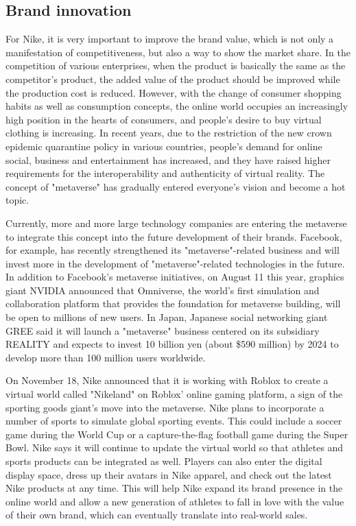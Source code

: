 \documentclass[a4paper, 12pt]{report}
\begin{document}
\subsection{Brand innovation}
For Nike, it is very important to improve the brand value, which is not only a manifestation of competitiveness, but also a way to show the market share. In the competition of various enterprises, when the product is basically the same as the competitor's product, the added value of the product should be improved while the production cost is reduced. However, with the change of consumer shopping habits as well as consumption concepts, the online world occupies an increasingly high position in the hearts of consumers, and people's desire to buy virtual clothing is increasing. In recent years, due to the restriction of the new crown epidemic quarantine policy in various countries, people's demand for online social, business and entertainment has increased, and they have raised higher requirements for the interoperability and authenticity of virtual reality. The concept of "metaverse" has gradually entered everyone's vision and become a hot topic.\par
Currently, more and more large technology companies are entering the metaverse to integrate this concept into the future development of their brands. Facebook, for example, has recently strengthened its "metaverse"-related business and will invest more in the development of "metaverse"-related technologies in the future. In addition to Facebook's metaverse initiatives, on August 11 this year, graphics giant NVIDIA announced that Omniverse, the world's first simulation and collaboration platform that provides the foundation for metaverse building, will be open to millions of new users. In Japan, Japanese social networking giant GREE said it will launch a "metaverse" business centered on its subsidiary REALITY and expects to invest 10 billion yen (about \$590 million) by 2024 to develop more than 100 million users worldwide.\par
On November 18, Nike announced that it is working with Roblox to create a virtual world called "Nikeland" on Roblox' online gaming platform, a sign of the sporting goods giant's move into the metaverse. Nike plans to incorporate a number of sports to simulate global sporting events. This could include a soccer game during the World Cup or a capture-the-flag football game during the Super Bowl. Nike says it will continue to update the virtual world so that athletes and sports products can be integrated as well. Players can also enter the digital display space, dress up their avatars in Nike apparel, and check out the latest Nike products at any time. This will help Nike expand its brand presence in the online world and allow a new generation of athletes to fall in love with the value of their own brand, which can eventually translate into real-world sales.\par
\end{document}
